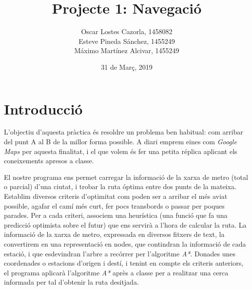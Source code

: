 \documentclass[a4paper,12pt]{article}
\begin{document}
    \title{\Large{\textbf{Projecte 1: Navegació}}}
    \author{Oscar Lostes Cazorla, 1458082\\
    Esteve Pineda Sánchez, 1455249\\
    Máximo Martínez Alcivar, 1455249}
    \date{31 de Març, 2019}

    \maketitle


    \let\cleardoublepage\clearpage

    \pagebreak

    \tableofcontents

    \pagestyle{fancy}
    \fancyhf{}
    \renewcommand{\headrulewidth}{2pt}
    \renewcommand{\footrulewidth}{1pt}

    \fancyhead[L]{\leftmark}

    \pagebreak

    \section{Introducció}

        L’objectiu d’aquesta pràctica és resoldre un problema ben habitual: com arribar del punt A al B de la millor forma possible. A diari emprem eines com \textit{Google Maps} per aquesta finalitat, i el que volem és fer una petita réplica aplicant els coneixements apresos a classe.
        
        El nostre programa ens permet carregar la informació de la xarxa de metro (total o parcial) d’una ciutat, i trobar la ruta óptima entre dos punts de la mateixa. Establim diversos criteris d’optimitat com poden ser a arribar el més aviat possible, agafar el camí més curt, fer pocs transbords o passar per poques parades. Per a cada criteri, associem una heurística (una funció que fa una predicció optimista sobre el futur) que ens servirà a l’hora de calcular la ruta. La informació de la xarxa de metro, expressada en diversos fitxers de text, la convertirem en una representació en nodes, que contindran la informació de cada estació, i que esdevindran l’arbre a recórrer per l'algoritme \textit{A*}.
        Donades unes coordenades o estacions d'origen i destí, i tenint en compte els criteris anteriors, el programa aplicarà l’algoritme \textit{A*} après a classe per a realitzar una cerca informada per tal d’obtenir la ruta desitjada.
\end{document}
